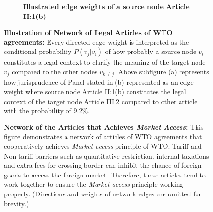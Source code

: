 \begin{figure}[]
    \begin{subfigure}[b]{1\textwidth}
        \centering{
            
        }
        \caption{\textbf{Illustrated edge weights of a source node Article II:1(b)}}
        \label{subfig:a:art2b}
    \end{subfigure}
    \vfill
    \begin{subfigure}[b]{1\textwidth}
    \end{subfigure}
    \caption{\textbf{Illustration of Network of Legal Articles of WTO agreements: }Every directed edge weight is interpreted as the conditional probability $P(v_j|v_i)$ of how probably a source node $v_i$ constitutes a legal context to clarify the meaning of the target node $v_j$ compared to the other nodes $v_{k \neq j}$. Above subfigure (a) represents how jurisprudence of Panel stated in (b) represented as an edge weight where source node Article II:1(b) constitutes the legal context of the target node Article III:2 compared to other article with the probability of $9.2\%$.}
    \label{fig:def-example}
\end{figure}

\begin{figure}
    \centering{
        
    }
    \caption{{\bf Network of the Articles that Achieves \textit{Market Access}:}
        This figure demonstrates a network of articles of WTO agreements
        that cooperatively achieves \textit{Market access} principle of WTO.
        Tariff and Non-tariff barriers such as quantitative restriction, internal taxations
        and extra fees for crossing border can inhibit the chance of foreign goods to access the foreign market.
        Therefore, these articles tend to work together to ensure the \textit{Market access} principle working properly.
        (Directions and weights of network edges are omitted for brevity.)
    }
    \label{fig:market-aceess_directed}
\end{figure}



